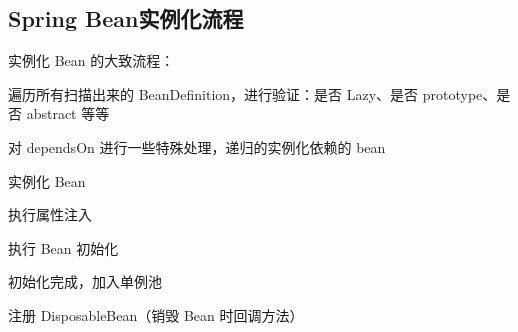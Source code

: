 \documentclass[../../../interview-questions.tex]{subfiles}
\begin{document}
\subsection{Spring Bean实例化流程}

实例化 Bean 的大致流程：

遍历所有扫描出来的 BeanDefinition，进行验证：是否 Lazy、是否 prototype、是否 abstract 等等

对 dependsOn 进行一些特殊处理，递归的实例化依赖的 bean

实例化 Bean

执行属性注入

执行 Bean 初始化

初始化完成，加入单例池

注册 DisposableBean（销毁 Bean 时回调方法）
\end{document}
